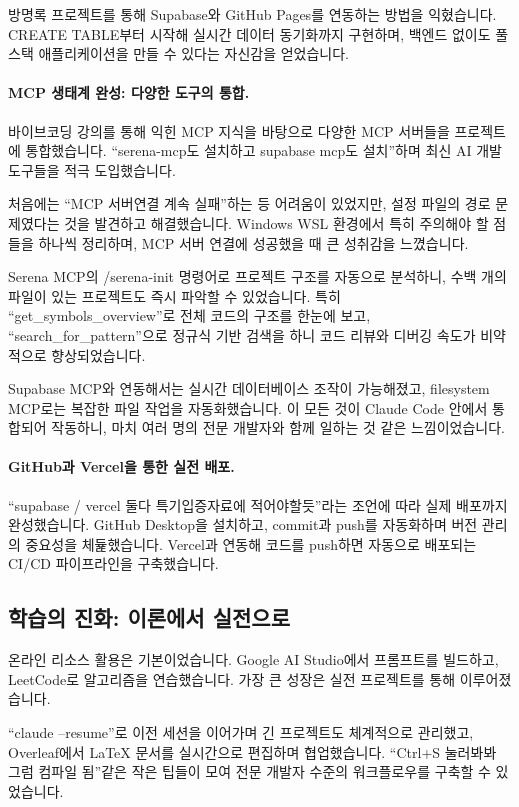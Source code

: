 방명록 프로젝트를 통해 Supabase와 GitHub Pages를 연동하는 방법을 익혔습니다. CREATE TABLE부터 시작해 실시간 데이터 동기화까지 구현하며, 백엔드 없이도 풀스택 애플리케이션을 만들 수 있다는 자신감을 얻었습니다.

\paragraph{MCP 생태계 완성: 다양한 도구의 통합.}
바이브코딩 강의를 통해 익힌 MCP 지식을 바탕으로 다양한 MCP 서버들을 프로젝트에 통합했습니다. ``serena-mcp도 설치하고 supabase mcp도 설치''하며 최신 AI 개발 도구들을 적극 도입했습니다. 

처음에는 ``MCP 서버연결 계속 실패''하는 등 어려움이 있었지만, 설정 파일의 경로 문제였다는 것을 발견하고 해결했습니다. Windows WSL 환경에서 특히 주의해야 할 점들을 하나씩 정리하며, MCP 서버 연결에 성공했을 때 큰 성취감을 느꼈습니다.

Serena MCP의 /serena-init 명령어로 프로젝트 구조를 자동으로 분석하니, 수백 개의 파일이 있는 프로젝트도 즉시 파악할 수 있었습니다. 특히 ``get\_symbols\_overview''로 전체 코드의 구조를 한눈에 보고, ``search\_for\_pattern''으로 정규식 기반 검색을 하니 코드 리뷰와 디버깅 속도가 비약적으로 향상되었습니다.

Supabase MCP와 연동해서는 실시간 데이터베이스 조작이 가능해졌고, filesystem MCP로는 복잡한 파일 작업을 자동화했습니다. 이 모든 것이 Claude Code 안에서 통합되어 작동하니, 마치 여러 명의 전문 개발자와 함께 일하는 것 같은 느낌이었습니다.

\paragraph{GitHub과 Vercel을 통한 실전 배포.}
``supabase / vercel 둘다 특기입증자료에 적어야할듯''라는 조언에 따라 실제 배포까지 완성했습니다. GitHub Desktop을 설치하고, commit과 push를 자동화하며 버전 관리의 중요성을 체듍했습니다. Vercel과 연동해 코드를 push하면 자동으로 배포되는 CI/CD 파이프라인을 구축했습니다.

\subsection{학습의 진화: 이론에서 실전으로}
온라인 리소스 활용은 기본이었습니다. Google AI Studio에서 프롬프트를 빌드하고, LeetCode로 알고리즘을 연습했습니다. 가장 큰 성장은 실전 프로젝트를 통해 이루어졌습니다. 

``claude --resume''로 이전 세션을 이어가며 긴 프로젝트도 체계적으로 관리했고, Overleaf에서 LaTeX 문서를 실시간으로 편집하며 협업했습니다. ``Ctrl+S 눌러봐봐 그럼 컴파일 됨''같은 작은 팁들이 모여 전문 개발자 수준의 워크플로우를 구축할 수 있었습니다.


